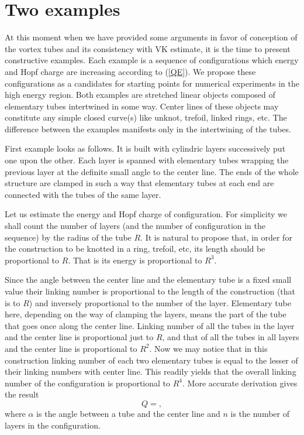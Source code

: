 \documentclass[a4paper,12pt]{article}
\begin{document}
\section{Two examples}
	At this moment when we have provided some arguments in favor
	of conception of the vortex tubes and its consistency
	with VK estimate, it is the time to present constructive
	examples. Each example is a sequence of configurations
	which energy and Hopf charge are increasing according to
(\ref{QE}).
	We propose these configurations as a candidates for
	starting points for numerical experiments in the high
	energy region. 
	Both examples are stretched linear objects composed of
	elementary tubes intertwined in some way. Center lines
	of these objects may constitute any simple closed curve(s)
	like unknot, trefoil, linked rings, etc.
	The difference between the examples manifests only in the 
	intertwining of the tubes.

	First example looks as follows.
	It is built with cylindric layers successively put one
	upon the other. Each layer is spanned with elementary tubes
	wrapping the previous layer at the definite small angle
	to the center line. The ends of the whole structure
	are clamped in such a way that elementary tubes at each end
	are connected with the tubes of the same layer.

	Let us estimate the energy and Hopf charge of configuration.
	For simplicity we shall count the number of layers (and the
	number of configuration in the sequence) by the radius of the tube
    $ R $.
	It is natural to propose that, in order for the construction
	to be knotted in a ring, trefoil, etc, its length 
	should be proportional to 
    $ R $.
	That is its energy is proportional to 
    $ R^{3} $.

	Since the angle between the center line and the elementary
	tube is a fixed small value their linking number is proportional
	to the length of the construction (that is to 
    $ R $)
	and inversely proportional to the number of the layer.
	Elementary tube here, depending on the way of clamping the
	layers, means the part of the tube that goes once along
	the center line.
	Linking number of all the tubes in the layer and the center line
	is proportional just to 
    $ R $,
	and that of all the tubes in all layers and the center line
	is proportional to 
    $ R^{2} $.
	Now we may notice that in this construction linking number
	of each two elementary tubes is equal to the lesser of their
	linking numbers with center line.
	This readily yields that the overall linking number of the
	configuration is proportional to 
    $ R^{4} $.
	More accurate derivation gives the result
\begin{equation}
    Q = ,
\end{equation}
	where 
    $ \alpha $
	is the angle between a tube and the center line and
    $ n $
	is the number of layers in the configuration.
\end{document}
